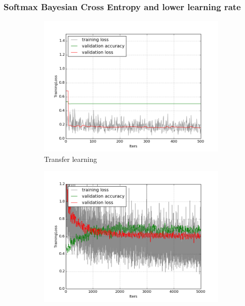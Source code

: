 \documentclass[a4paper,11pt]{article}
\begin{document}
\subsubsection{Softmax Bayesian Cross Entropy and lower learning rate}
\begin{figure}
    \centering
    \begin{minipage}[b]{\textwidth}
      \begin{subfigure}{.5\textwidth} 
        \centering
        \includegraphics[scale=0.4]{images/plot_soil_contam_noneC.png}
        \caption{Transfer learning}\label{fig:2a}
      \end{subfigure}%
      \begin{subfigure}{.5\textwidth} 
        \centering
        \includegraphics[scale=0.4]{images/plot_soil_contam_none_lr5_sbl-5000.png}

\end{subfigure}
\end{minipage}
\end{figure}
\end{document}
